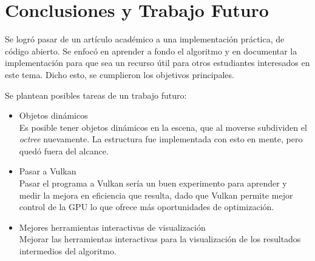 \graphicspath{{chapters/6_conclusión/figures/}}



\chapter{Conclusiones y Trabajo Futuro}\label{chap:conclusions}

Se logró pasar de un artículo académico a una implementación práctica, de código abierto.
Se enfocó en aprender a fondo el algoritmo y en documentar la implementación para que sea un recurso útil para otros estudiantes interesados en este tema.
Dicho esto, se cumplieron los objetivos principales.

Se plantean posibles tareas de un trabajo futuro:
\begin{itemize}
    \item Objetos dinámicos\\
        Es posible tener objetos dinámicos en la escena, que al moverse subdividen el \textit{octree} nuevamente.
        La estructura fue implementada con esto en mente, pero quedó fuera del alcance.
    \item Pasar a Vulkan\\
        Pasar el programa a Vulkan sería un buen experimento para aprender y medir la mejora en eficiencia que resulta, dado que Vulkan permite mejor control de la GPU lo que ofrece más oportunidades de optimización.
    \item Mejores herramientas interactivas de visualización\\
        Mejorar las herramientas interactivas para la visualización de los resultados intermedios del algoritmo.
\end{itemize}
